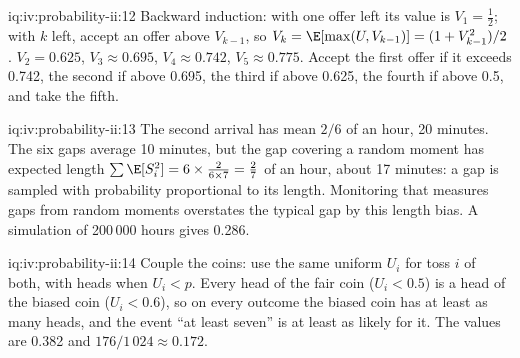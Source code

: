 \begin{solution}{iq:iv:probability-ii:12}
Backward induction: with one offer left its value is $V_1 = \tfrac12$; with $k$ left, accept an offer above
$V_{k-1}$, so $V_k = \E[\max(U, V_{k-1})] = (1 + V_{k-1}^2)/2$. $V_2 = 0.625$, $V_3 \approx 0.695$, $V_4
\approx 0.742$, $V_5 \approx 0.775$. Accept the first offer if it exceeds 0.742, the second if above 0.695, the
third if above 0.625, the fourth if above 0.5, and take the fifth.
\end{solution}

\begin{solution}{iq:iv:probability-ii:13}
The second arrival has mean $2/6$ of an hour, 20 minutes. The six gaps average 10 minutes, but the gap covering a
random moment has expected length $\sum \E[S_i^2] = 6 \times \tfrac{2}{6 \times 7} = \tfrac27$ of an hour, about 17
minutes: a gap is sampled with probability proportional to its length. Monitoring that measures gaps from
random moments overstates the typical gap by this length bias. A simulation of 200\,000 hours gives 0.286.
\end{solution}

\begin{solution}{iq:iv:probability-ii:14}
Couple the coins: use the same uniform $U_i$ for toss $i$ of both, with heads when $U_i < p$. Every head of the
fair coin ($U_i < 0.5$) is a head of the biased coin ($U_i < 0.6$), so on every outcome the biased coin has at
least as many heads, and the event ``at least seven'' is at least as likely for it. The values are 0.382 and
$176/1\,024 \approx 0.172$.
\end{solution}
